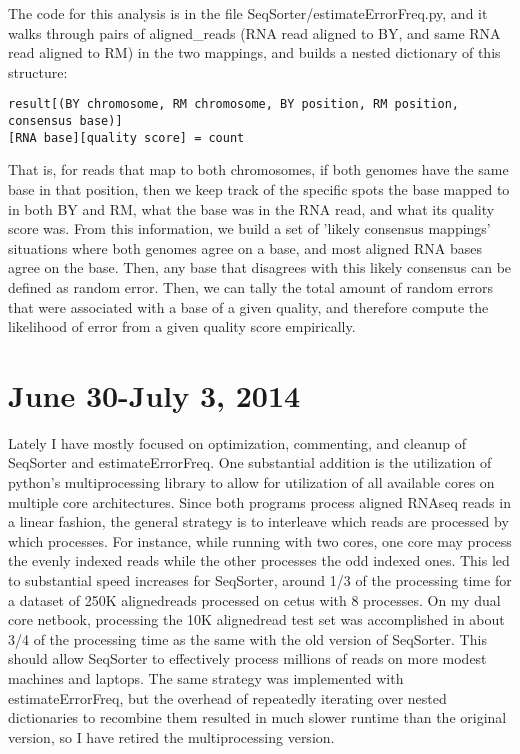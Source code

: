 \documentclass[11pt]{article}
\begin{document}
The code for this analysis is in the file SeqSorter/estimateErrorFreq.py, and it walks through pairs of aligned\_reads (RNA read aligned to BY, and same RNA read aligned to RM) in the two mappings, and builds a nested dictionary of this structure:
\begin{verbatim}
result[(BY chromosome, RM chromosome, BY position, RM position, consensus base)]
[RNA base][quality score] = count
\end{verbatim}
That is, for reads that map to both chromosomes, if both genomes have the same base in that position, then we keep track of the specific spots the base mapped to in both BY and RM, what the base was in the RNA read, and what its quality score was. From this information, we build a set of 'likely consensus mappings' situations where both genomes agree on a base, and most aligned RNA bases agree on the base. Then, any base that disagrees with this likely consensus can be defined as random error. Then, we can tally the total amount of random errors that were associated with a base of a given quality, and therefore compute the likelihood of error from a given quality score empirically.

\section*{June 30-July 3, 2014}
Lately I have mostly focused on optimization, commenting, and cleanup of SeqSorter and estimateErrorFreq. One substantial addition is the utilization of python's multiprocessing library to allow for utilization of all available cores on multiple core architectures. Since both programs process aligned RNAseq reads in a linear fashion, the general strategy is to interleave which reads are processed by which processes. For instance, while running with two cores, one core may process the evenly indexed reads while the other processes the odd indexed ones. This led to substantial speed increases for SeqSorter, around 1/3 of the processing time for a dataset of 250K alignedreads processed on cetus with 8 processes. On my dual core netbook, processing the 10K alignedread test set was accomplished in about 3/4 of the processing time as the same with the old version of SeqSorter. This should allow SeqSorter to effectively process millions of reads on more modest machines and laptops. The same strategy was implemented with estimateErrorFreq, but the overhead of repeatedly iterating over nested dictionaries to recombine them resulted in much slower runtime than the original version, so I have retired the multiprocessing version.
\end{document}
